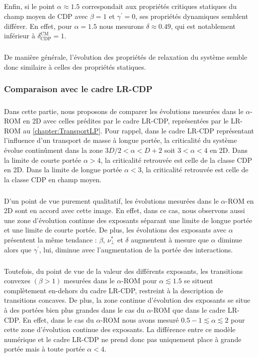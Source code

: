 \subparagraph{}Enfin, si le point $\alpha\approx 1.5$ correspondait aux propriétés critiques statiques du champ moyen de CDP avec $\beta=1$ et $\gamma^\prime=0$, ses propriétés dynamiques semblent différer. En effet, pour $\alpha = 1.5$ nous mesurons $\delta\approx 0.49$, qui est notablement inférieur à $\delta_\text{CDP}^\text{CM}=1$. 

\subparagraph{}De manière générale, l'évolution des propriétés de relaxation du système semble donc similaire à celles des propriétés statiques.

\subsubsection{Comparaison avec le cadre LR-CDP}

\subparagraph{}Dans cette partie, nous proposons de comparer les évolutions mesurées dans le $\alpha$-ROM en 2D avec celles prédites par le cadre LR-CDP, représentées par le LR-ROM au \autoref{chapter:TransportLP}. Pour rappel, dans le cadre LR-CDP représentant l'influence d'un transport de masse à longue portée, la criticalité du système évolue continûment dans la zone $3D/2 < \alpha < D+2$ soit $3 < \alpha < 4$ en 2D. Dans la limite de courte portée $\alpha > 4$, la criticalité retrouvée est celle de la classe CDP en 2D. Dans la limite de longue portée $\alpha < 3$, la criticalité retrouvée est celle de la classe CDP en champ moyen. 

\subparagraph{}D'un point de vue purement qualitatif, les évolutions mesurées dans le $\alpha$-ROM en 2D sont en accord avec cette image. En effet, dans ce cas, nous observons aussi une zone d'évolution continue des exposants séparant une limite de longue portée et une limite de courte portée. De plus, les évolutions des exposants avec $\alpha$ présentent la même tendance : $\beta$, $\nu_\perp^*$ et $\delta$ augmentent à mesure que $\alpha$ diminue alors que $\gamma^\prime$, lui, diminue avec l'augmentation de la portée des interactions.

\subparagraph{}Toutefois, du point de vue de la valeur des différents exposants, les transitions convexes $(\beta > 1)$ mesurées dans le $\alpha$-ROM pour $\alpha \lesssim 1.5$ se situent complètement en-dehors du cadre LR-CDP, restreint à la description de transitions concaves. De plus, la zone continue d'évolution des exposants se situe à des portées bien plus grandes dans le cas du $\alpha$-ROM que dans le cadre LR-CDP. En effet, dans le cas du $\alpha$-ROM nous avons mesuré $0.5-1 \lesssim \alpha \lesssim 2$ pour cette zone d'évolution continue des exposants. La différence entre ce modèle numérique et le cadre LR-CDP ne prend donc pas uniquement place à grande portée mais à toute portée $\alpha < 4$.

